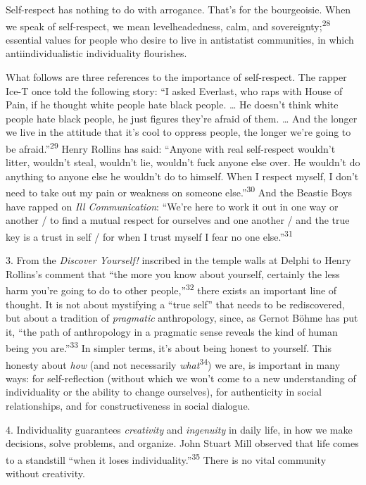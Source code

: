 Self-respect has nothing to do with arrogance. That’s for the bourgeoisie. When
we speak of self-respect, we mean levelheadedness, calm, and
sovereignty;\textsuperscript{28} essential values for people who desire to live
in antistatist communities, in which antiindividualistic individuality
flourishes.

What follows are three references to the importance of self-respect. The rapper
Ice-T once told the following story: “I asked Everlast, who raps with House of
Pain, if he thought white people hate black people. … He doesn’t think white
people hate black people, he just figures they’re afraid of them. … And the
longer we live in the attitude that it’s cool to oppress people, the longer
we’re going to be afraid.”\textsuperscript{29} Henry Rollins has said: “Anyone
with real self-respect wouldn’t litter, wouldn’t steal, wouldn’t lie, wouldn’t
fuck anyone else over. He wouldn’t do anything to anyone else he wouldn’t do to
himself. When I respect myself, I don’t need to take out my pain or weakness on
someone else.”\textsuperscript{30} And the Beastie Boys have rapped on
\textit{Ill Communication}: “We’re here to work it out in one way or another /
to find a mutual respect for ourselves and one another / and the true key is a
trust in self / for when I trust myself I fear no one else.”\textsuperscript{31}

3. From the \textit{Discover Yourself!} inscribed in the temple walls at Delphi
to Henry Rollins’s comment that “the more you know about yourself, certainly the
less harm you’re going to do to other people,”\textsuperscript{32} there exists
an important line of thought. It is not about mystifying a “true self” that
needs to be rediscovered, but about a tradition of \textit{pragmatic}
anthropology, since, as Gernot Böhme has put it, “the path of anthropology in a
pragmatic sense reveals the kind of human being you are.”\textsuperscript{33}
In simpler terms, it’s about being honest to yourself. This honesty about
\textit{how} (and not necessarily \textit{what}\textsuperscript{34}) we are, is
important in many ways: for self-reflection (without which we won’t come to a
new understanding of individuality or the ability to change ourselves), for
authenticity in social relationships, and for constructiveness in social
dialogue.

4. Individuality guarantees \textit{creativity} and \textit{ingenuity} in daily
life, in how we make decisions, solve problems, and organize. John Stuart Mill
observed that life comes to a standstill “when it loses
individuality.”\textsuperscript{35} There is no vital community without
creativity.

